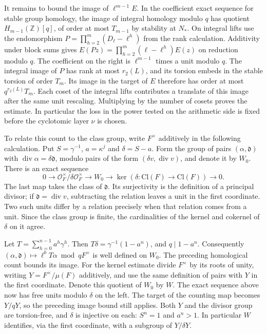 \documentclass[11pt]{amsart}
\theoremstyle{definition}
\theoremstyle{remark}
\begin{document}
It remains to bound the image of $\ell^{m-1}E$. In the coefficient
exact sequence for stable group homology, the image of integral
homology modulo $q$ has quotient $H_{m-1}(\mathbb Z)[q]$, of order
at most $T_{m-1}$ by stability at $N_*$. On integral lifts use the
endomorphism $P=\prod_{h=2}^m(D_\ell-\ell^h)$ from the rank calculation.
Additivity under block sums gives
$E(Pz)=\prod_{h=2}^m(\ell-\ell^h)E(z)$ on reduction modulo $q$.
The coefficient on the right is $\ell^{m-1}$ times a unit modulo $q$.
The integral image of $P$ has rank at most $r_2(L)$, and its torsion
embeds in the stable torsion of order $T_m$. Its image in the target
of $E$ therefore has order at most $q^{r_2(L)}T_m$. Each coset
of the integral lifts contributes a translate of this image after
the same unit rescaling. Multiplying by the number of cosets proves
the estimate. In particular the loss in the power tested on the
arithmetic side is fixed before the cyclotomic layer $\nu$ is chosen.

To relate this count to the class group, write $F^\times$ additively
in the following calculation. Put $S=\gamma^{-1}$, $a=\kappa^j$ and
$\delta=S-a$. Form the group of pairs $(\alpha,\mathfrak d)$ with
$\operatorname{div}\alpha=\delta\mathfrak d$, modulo pairs of the form
$(\delta v,\operatorname{div}v)$, and denote it by $W_0$. There is
an exact sequence
\[
 0\longrightarrow \mathcal O_F^\times/\delta\mathcal O_F^\times
 \longrightarrow W_0\longrightarrow \ker(\delta:\mathrm{Cl}(F)
 \to\mathrm{Cl}(F))\longrightarrow0 .
\]
The last map takes the class of $\mathfrak d$. Its surjectivity is
the definition of a principal divisor; if $\mathfrak d=\operatorname{div}v$,
subtracting the relation leaves a unit in the first coordinate.
Two such units differ by a relation precisely when that relation
comes from a unit. Since the class group is finite, the cardinalities
of the kernel and cokernel of $\delta$ on it agree.

Let $T=\sum_{h=0}^{n-1}a^h\gamma^h$. Then
$T\delta=\gamma^{-1}(1-a^n)$, and $q\mid1-a^n$.
Consequently $(\alpha,\mathfrak d)\mapsto\ell^bT\alpha\bmod q F^\times$
is well defined on $W_0$. The preceding homological count bounds its
image. For the kernel estimate divide $F^\times$ by its roots of unity,
writing $Y=F^\times/\mu(F)$ additively, and use the same definition
of pairs with $Y$ in the first coordinate. Denote this quotient of
$W_0$ by $W$. The exact sequence above now has free units modulo
$\delta$ on the left. The target of the counting map becomes $Y/qY$,
so the preceding image bound still applies. Both $Y$ and the divisor
group are torsion-free, and $\delta$ is injective on each: $S^n=1$
and $a^n>1$. In particular $W$ identifies, via the first coordinate,
with a subgroup of $Y/\delta Y$.
\end{document}
